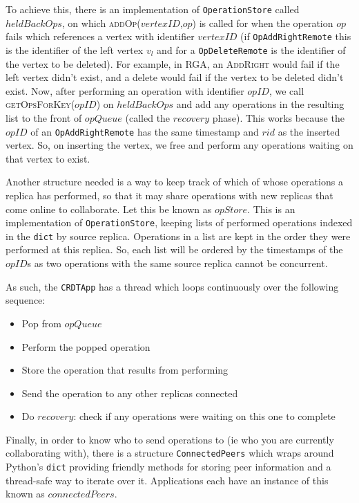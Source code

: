 \documentclass[diss.tex]{subfiles}
\begin{document}
To achieve this, there is an implementation of \texttt{OperationStore} called $heldBackOps$, on which \textsc{addOp}($ vertexID$,$op$) is called for when the operation $op$ fails which references a vertex with identifier $vertexID$ (if \texttt{OpAddRightRemote} this is the identifier of the left vertex $v_l$ and for a \texttt{OpDeleteRemote} is the identifier of the vertex to be deleted). For example, in RGA, an \textsc{AddRight} would fail if the left vertex didn't exist, and a delete would fail if the vertex to be deleted didn't exist. Now, after performing an operation with identifier $opID$, we call \textsc{getOpsForKey}($opID$) on $heldBackOps$ and add any operations in the resulting list to the front of $opQueue$ (called the $recovery$ phase). This works because the $opID$ of an \texttt{OpAddRightRemote} has the same timestamp and $rid$ as the inserted vertex. So, on inserting the vertex, we free and perform any operations waiting on that vertex to exist.


Another structure needed is a way to keep track of which of whose operations a replica has performed, so that it may share operations with new replicas that come online to collaborate. Let this be known as $opStore$. This is an implementation of \texttt{OperationStore}, keeping lists of performed operations indexed in the \texttt{dict} by source replica. Operations in a list are kept in the order they were performed at this replica. So, each list will be ordered by the timestamps of the $opID$s as two operations with the same source replica cannot be concurrent. 

As such, the \texttt{CRDTApp} has a thread which loops continuously over the following sequence:

\begin{itemize}
\item Pop from $opQueue$
\item Perform the popped operation
\item Store the operation that results from performing
\item Send the operation to any other replicas connected
\item Do $recovery$: check if any operations were waiting on this one to complete
\end{itemize}

Finally, in order to know who to send operations to (ie who you are currently collaborating with), there is a structure \texttt{ConnectedPeers} which wraps around Python's \texttt{dict} providing friendly methods for storing peer information and a thread-safe way to iterate over it. Applications each have an instance of this known as $connectedPeers$.
%
%
%
%
%
%
\end{document}
